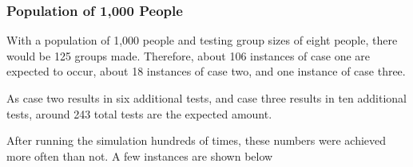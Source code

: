 \documentclass[letterpaper, 10pt,DIV=13]{scrartcl}
\numberwithin{equation}{section} %
\numberwithin{figure}{section} %
\numberwithin{table}{section} %
\begin{document}
\subsubsection{Population of 1,000 People}

With a population of 1,000 people and testing group sizes of eight people, there would be 125 groups made.  Therefore, about 106 instances of case one are expected to occur, about 18 instances of case two, and one instance of case three.  

As case two results in six additional tests, and case three results in ten additional tests, around 243 total tests are the expected amount.

After running the simulation hundreds of times, these numbers were achieved more often than not.  A few instances are shown below
\end{document}
